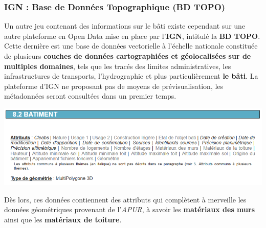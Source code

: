 \documentclass[
  11pt,
  french,
]{article}
\newcounter{customfigs}[section]
\newenvironment{customfigs}[1][] {
    \stepcounter{customfigs}
    Fig \arabic{section}. \arabic{customfigs} : }
\newcommand{\masked}{\vspace*{-\baselineskip}}
\begin{document}
\newpage

\hypertarget{ign-base-de-donnuxe9es-topographique-bd-topo}{%
\subsubsection{IGN : Base de Données Topographique (BD
TOPO)}\label{ign-base-de-donnuxe9es-topographique-bd-topo}}

Un autre jeu contenant des informations sur le bâti existe cependant sur
une autre plateforme en Open Data mise en place par l'\textbf{IGN},
intitulé la \textbf{BD TOPO}. Cette dernière est une base de données
vectorielle à l'échelle nationale constituée de plusieurs
\textbf{couches de données cartographiées et géolocalisées sur de
multiples domaines}, tels que les tracés des limites administratives,
les infrastructures de transports, l'hydrographie et plus
particulièrement \textbf{le bâti}. La plateforme d'IGN ne proposant pas
de moyens de prévisualisation, les métadonnées seront consultées dans un
premier temps.

\begin{tcolorbox}[title=\begin{customfigs} Extrait des métadonnées : attributs pour chaque bâtiment dans la BD TOPO \end{customfigs}]

\begin{center}\includegraphics[width=1\linewidth]{__imgs/meta_ign} \end{center}

\end{tcolorbox}

Dès lors, ces données contiennent des attributs qui complètent à
merveille les données géométriques provenant de l'\emph{APUR}, à savoir
les \textbf{matériaux des murs} ainsi que les \textbf{matériaux de
toiture}.
\end{document}
